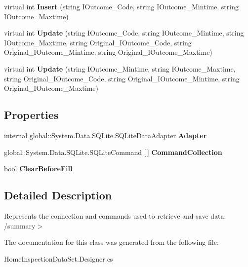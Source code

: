\begin{DoxyCompactItemize}
virtual int {\bfseries Insert} (string I\+Outcome\+\_\+\+Code, string I\+Outcome\+\_\+\+Mintime, string I\+Outcome\+\_\+\+Maxtime)
\item 
\mbox{\label{class_a_f_h___scheduler_1_1_home_inspection_data_set_table_adapters_1_1_inspection___outcome_table_adapter_a8ab451bcd561c3c0fb05b02c946c47eb}} 
virtual int {\bfseries Update} (string I\+Outcome\+\_\+\+Code, string I\+Outcome\+\_\+\+Mintime, string I\+Outcome\+\_\+\+Maxtime, string Original\+\_\+\+I\+Outcome\+\_\+\+Code, string Original\+\_\+\+I\+Outcome\+\_\+\+Mintime, string Original\+\_\+\+I\+Outcome\+\_\+\+Maxtime)
\item 
\mbox{\label{class_a_f_h___scheduler_1_1_home_inspection_data_set_table_adapters_1_1_inspection___outcome_table_adapter_a6d7fe4f75d764da24a7b84596c58c6ab}} 
virtual int {\bfseries Update} (string I\+Outcome\+\_\+\+Mintime, string I\+Outcome\+\_\+\+Maxtime, string Original\+\_\+\+I\+Outcome\+\_\+\+Code, string Original\+\_\+\+I\+Outcome\+\_\+\+Mintime, string Original\+\_\+\+I\+Outcome\+\_\+\+Maxtime)
\end{DoxyCompactItemize}
\subsection*{Properties}
\begin{DoxyCompactItemize}
\item 
\mbox{\label{class_a_f_h___scheduler_1_1_home_inspection_data_set_table_adapters_1_1_inspection___outcome_table_adapter_ac72f44458f10056c0eadc741bffa0e0d}} 
internal global\+::\+System.\+Data.\+S\+Q\+Lite.\+S\+Q\+Lite\+Data\+Adapter {\bfseries Adapter}\hspace{0.3cm}{\ttfamily  [get]}
\item 
\mbox{\label{class_a_f_h___scheduler_1_1_home_inspection_data_set_table_adapters_1_1_inspection___outcome_table_adapter_a766ee3f0726b7bcce5e3eb1a9d340f95}} 
global\+::\+System.\+Data.\+S\+Q\+Lite.\+S\+Q\+Lite\+Command [$\,$] {\bfseries Command\+Collection}\hspace{0.3cm}{\ttfamily  [get]}
\item 
\mbox{\label{class_a_f_h___scheduler_1_1_home_inspection_data_set_table_adapters_1_1_inspection___outcome_table_adapter_a6558dd9830e70630623d23814b0ac10e}} 
bool {\bfseries Clear\+Before\+Fill}\hspace{0.3cm}{\ttfamily  [get, set]}
\end{DoxyCompactItemize}


\subsection{Detailed Description}
Represents the connection and commands used to retrieve and save data. /summary$>$ 

The documentation for this class was generated from the following file\+:\begin{DoxyCompactItemize}
\item 
Home\+Inspection\+Data\+Set.\+Designer.\+cs\end{DoxyCompactItemize}
